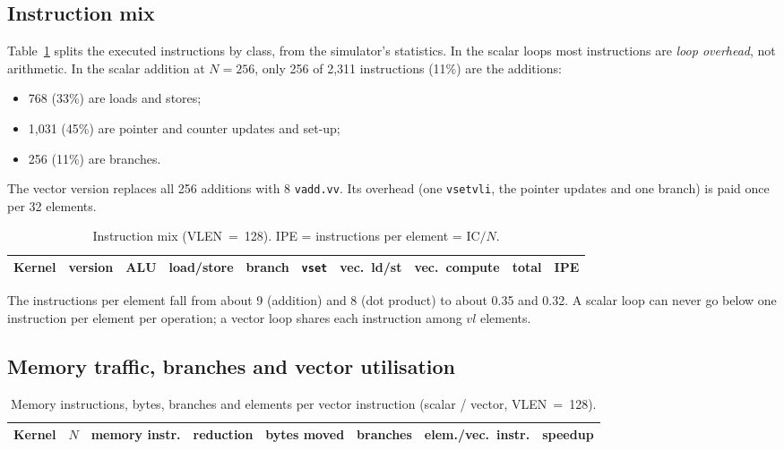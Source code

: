 \documentclass[11pt,a4paper]{article}
\newcommand{\code}[1]{\texttt{#1}}
\begin{document}
\subsection{Instruction mix}

Table~\ref{tab:mix} splits the executed instructions by class, from the simulator's
statistics. In the scalar loops most instructions are \emph{loop overhead}, not arithmetic. In
the scalar addition at $N=256$, only 256 of 2{,}311 instructions (11\%) are the additions:
\begin{itemize}
  \item 768 (33\%) are loads and stores;
  \item 1{,}031 (45\%) are pointer and counter updates and set-up;
  \item 256 (11\%) are branches.
\end{itemize}
The vector version replaces all 256 additions with 8 \code{vadd.vv}. Its overhead (one
\code{vsetvli}, the pointer updates and one branch) is paid once per 32 elements.

\begin{table}[H]
\centering\footnotesize\setlength{\tabcolsep}{4.5pt}
\caption{Instruction mix (VLEN~=~128). IPE = instructions per element = IC$/N$.}
\label{tab:mix}
\begin{tabular}{llrrrrrrrr}
\toprule
Kernel & version & ALU & load/store & branch & \code{vset} & vec.\ ld/st & vec.\ compute &
total & IPE \\
\midrule

\bottomrule
\end{tabular}
\end{table}

The instructions per element fall from about 9 (addition) and 8 (dot product) to about
0.35 and 0.32. A scalar loop can never go below one instruction per element per operation; a
vector loop shares each instruction among $vl$ elements.

\subsection{Memory traffic, branches and vector utilisation}

\begin{table}[H]
\centering\footnotesize\setlength{\tabcolsep}{4.5pt}
\caption{Memory instructions, bytes, branches and elements per vector instruction
(scalar / vector, VLEN~=~128).}
\label{tab:mem}
\begin{tabular}{lrrrrrrr}
\toprule
Kernel & $N$ & memory instr. & reduction & bytes moved & branches & elem./vec.\ instr. &
speedup \\
\midrule

\bottomrule
\end{tabular}
\end{table}
\end{document}
